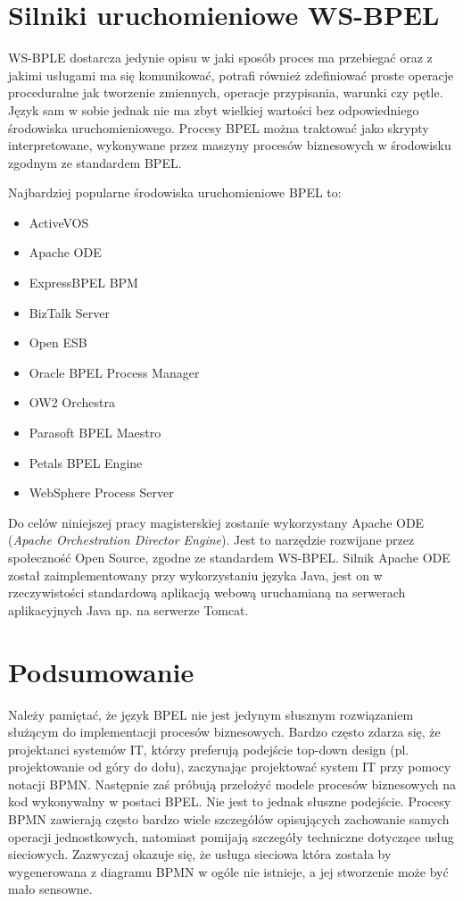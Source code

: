 
\section{Silniki uruchomieniowe WS-BPEL}
\label{sec:bpelEngines}
WS-BPLE dostarcza jedynie opisu w jaki sposób proces ma przebiegać oraz z jakimi usługami ma się komunikować, potrafi również zdefiniować proste operacje proceduralne jak tworzenie zmiennych, operacje przypisania, warunki czy pętle. Język sam w sobie jednak nie ma zbyt wielkiej wartości bez odpowiedniego środowiska uruchomieniowego. Procesy BPEL można traktować jako skrypty interpretowane, wykonywane przez maszyny procesów biznesowych w środowisku zgodnym ze standardem BPEL. 

Najbardziej popularne środowiska uruchomieniowe BPEL to:

\begin{itemize}
\item ActiveVOS 
\item Apache ODE
\item ExpressBPEL BPM
\item BizTalk Server
\item Open ESB
\item Oracle BPEL Process Manager
\item OW2 Orchestra
\item Parasoft BPEL Maestro
\item Petals BPEL Engine
\item WebSphere Process Server
\end{itemize}

Do celów niniejszej pracy magisterskiej zostanie wykorzystany Apache ODE (\textit{Apache Orchestration Director Engine}). Jest to narzędzie rozwijane przez społeczność Open Source, zgodne ze standardem WS-BPEL. Silnik Apache ODE został zaimplementowany przy wykorzystaniu języka Java, jest on w rzeczywistości standardową aplikacją webową uruchamianą na serwerach aplikacyjnych Java np. na serwerze Tomcat. 


\section{Podsumowanie}
\label{sec:bpelSummary}
Należy pamiętać, że język BPEL nie jest jedynym słusznym rozwiązaniem służącym do implementacji procesów biznesowych. Bardzo często  zdarza się, że projektanci systemów IT, którzy preferują podejście top-down design (pl. projektowanie od góry do dołu), zaczynając projektować system IT przy pomocy notacji BPMN. Następnie zaś próbują przełożyć modele procesów biznesowych na kod wykonywalny w postaci BPEL. Nie jest to jednak słuszne podejście. Procesy BPMN zawierają często bardzo wiele szczegółów opisujących zachowanie samych operacji jednostkowych, natomiast pomijają szczegóły techniczne dotyczące usług sieciowych.  Zazwyczaj okazuje się, że usługa sieciowa która została by wygenerowana z diagramu BPMN w ogóle nie istnieje, a jej stworzenie może być mało sensowne.

